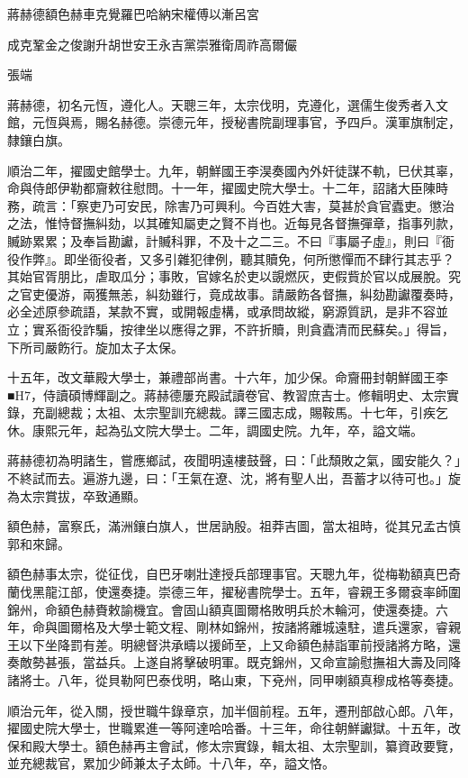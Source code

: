 
\begin{pinyinscope}
蔣赫德額色赫車克覺羅巴哈納宋權傅以漸呂宮

成克鞏金之俊謝升胡世安王永吉黨崇雅衛周祚高爾儼

張端

蔣赫德，初名元恆，遵化人。天聰三年，太宗伐明，克遵化，選儒生俊秀者入文館，元恆與焉，賜名赫德。崇德元年，授秘書院副理事官，予四戶。漢軍旗制定，隸鑲白旗。

順治二年，擢國史館學士。九年，朝鮮國王李淏奏國內外奸徒謀不軌，巳伏其辜，命與侍郎伊勒都齎敕往慰問。十一年，擢國史院大學士。十二年，詔諸大臣陳時務，疏言：「察吏乃可安民，除害乃可興利。今百姓大害，莫甚於貪官蠹吏。懲治之法，惟恃督撫糾劾，以其確知屬吏之賢不肖也。近每見各督撫彈章，指事列款，贓跡累累；及奉旨勘讞，計贓科罪，不及十之二三。不曰『事屬子虛』，則曰『衙役作弊』。即坐衙役者，又多引雜犯律例，聽其贖免，何所懲憚而不肆行其志乎？其始官胥朋比，虐取瓜分；事敗，官嫁名於吏以覬燃灰，吏假貲於官以成展脫。究之官吏優游，兩獲無恙，糾劾雖行，竟成故事。請嚴飭各督撫，糾劾勘讞覆奏時，必全述原參疏語，某款不實，或開報虛構，或承問故縱，窮源質訊，是非不容並立；實系衙役詐騙，按律坐以應得之罪，不許折贖，則貪蠹清而民蘇矣。」得旨，下所司嚴飭行。旋加太子太保。

十五年，改文華殿大學士，兼禮部尚書。十六年，加少保。命齎冊封朝鮮國王李■H7，侍讀碩博輝副之。蔣赫德屢充殿試讀卷官、教習庶吉士。修輯明史、太宗實錄，充副總裁；太祖、太宗聖訓充總裁。譯三國志成，賜鞍馬。十七年，引疾乞休。康熙元年，起為弘文院大學士。二年，調國史院。九年，卒，謚文端。

蔣赫德初為明諸生，嘗應鄉試，夜聞明遠樓鼓聲，曰：「此頹敗之氣，國安能久？」不終試而去。遍游九邊，曰：「王氣在遼、沈，將有聖人出，吾蓄才以待可也。」旋為太宗賞拔，卒致通顯。

額色赫，富察氏，滿洲鑲白旗人，世居訥殷。祖莽吉圖，當太祖時，從其兄孟古慎郭和來歸。

額色赫事太宗，從征伐，自巴牙喇壯達授兵部理事官。天聰九年，從梅勒額真巴奇蘭伐黑龍江部，使還奏捷。崇德三年，擢秘書院學士。五年，睿親王多爾袞率師圍錦州，命額色赫賚敕諭機宜。會固山額真圖爾格敗明兵於木輪河，使還奏捷。六年，命與圖爾格及大學士範文程、剛林如錦州，按諸將離城遠駐，遣兵還家，睿親王以下坐降罰有差。明總督洪承疇以援師至，上又命額色赫詣軍前授諸將方略，還奏敵勢甚張，當益兵。上遂自將擊破明軍。既克錦州，又命宣諭慰撫祖大壽及同降諸將士。八年，從貝勒阿巴泰伐明，略山東，下兗州，同甲喇額真穆成格等奏捷。

順治元年，從入關，授世職牛錄章京，加半個前程。五年，遷刑部啟心郎。八年，擢國史院大學士，世職累進一等阿達哈哈番。十三年，命往朝鮮讞獄。十五年，改保和殿大學士。額色赫再主會試，修太宗實錄，輯太祖、太宗聖訓，纂資政要覽，並充總裁官，累加少師兼太子太師。十八年，卒，謚文恪。


\end{pinyinscope}
